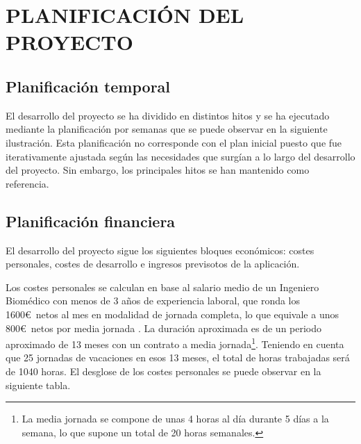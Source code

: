 \chapter{PLANIFICACIÓN DEL PROYECTO}\label{planif}
    \section{Planificación temporal}\label{ptemp}
    El desarrollo del proyecto se ha dividido en distintos hitos y se ha ejecutado mediante la planificación por semanas que se puede observar en la siguiente ilustración. Esta planificación no corresponde con el plan inicial puesto que fue iterativamente ajustada según las necesidades que surgían a lo largo del desarrollo del proyecto. Sin embargo, los principales hitos se han mantenido como referencia.


    \section{Planificación financiera}\label{pfin}

    El desarrollo del proyecto sigue los siguientes bloques económicos: costes personales, costes de desarrollo e ingresos previsotos de la aplicación.

    Los costes personales se calculan en base al salario medio de un Ingeniero Biomédico con menos de 3 años de experiencia laboral, que ronda los  1600\euro\ netos al mes en modalidad de jornada completa, lo que equivale a unos 800\euro\ netos por media jornada \cite{salario_ingeniero}. La duración aproximada es de un periodo aproximado de 13 meses con un contrato a media jornada\footnote{La media jornada se compone de unas 4 horas al día durante 5 días a la semana, lo que supone un total de 20 horas semanales.}. Teniendo en cuenta que 25 jornadas de vacaciones en esos 13 meses, el total de horas trabajadas será de 1040 horas. El desglose de los costes personales se puede observar en la siguiente tabla. 

